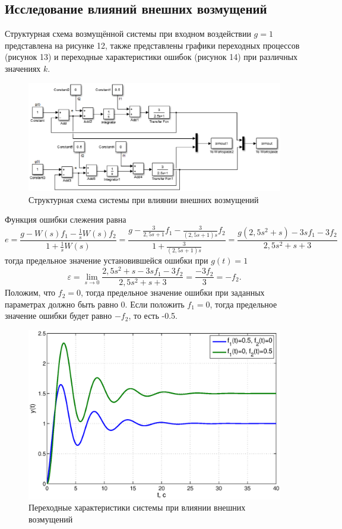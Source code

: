 \documentclass[12pt,a4paper]{article}
\begin{document}
\newpage
\begin{center}
\section{Исследование влияний внешних возмущений}
\end{center}
Структурная схема возмущённой системы при входном воздействии $g=1$ представлена на рисунке 12, также представлены графики переходных процессов (рисунок 13) и переходные характеристики ошибок (рисунок 14) при различных значениях $k$.
\begin{figure}[H]
    \centering
    \includegraphics[width=0.8\linewidth]{cxema3.eps}
    \caption{Структурная схема системы при влиянии внешних возмущений}
\end{figure}
Функция ошибки слежения равна
\begin{equation}
e = \frac{g - W(s)f_1 - \displaystyle{\frac{1}{s}}W(s)f_2}{1 + \displaystyle{\frac{1}{s}}W(s)} = \frac{g - \displaystyle{\frac{3}{2,5s + 1}}f_1 - \displaystyle{\frac{3}{(2,5s + 1)s}}f_2}{1 + \displaystyle{\frac{3}{(2,5s + 1)s}}} = \frac{g(2,5s^2 + s) - 3sf_1 - 3f_2}{2,5s^2 + s + 3}
\end{equation}
тогда предельное значение установившейся ошибки при $g(t) = 1$
\begin{equation}
\varepsilon = \lim_{s \to 0} \frac{2,5s^2 + s - 3sf_1 - 3f_2}{2,5s^2 + s + 3} = \frac{-3f_2}{3} = -f_2.
\end{equation}
Положим, что $f_2=0$, тогда предельное значение ошибки при заданных параметрах должно быть равно 0. Если положить  $f_1=0$, тогда предельное значение ошибки будет равно $-f_2$, то есть -0.5.
\begin{figure}[H]
    \centering
    \includegraphics[width=1\linewidth]{3.1.eps}
    \caption{Переходные характеристики системы при влиянии внешних возмущений}
\end{figure}
\end{document}
